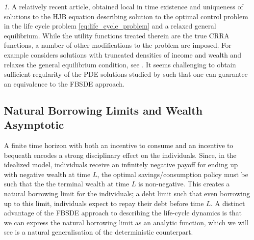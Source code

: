 \documentclass[11pt,oneside,english,reqno,dvipsnames,table]{amsart}
\numberwithin{equation}{section}
\theoremstyle{plain}
\theoremstyle{definition}
\theoremstyle{remark}
\newtheorem{rem}[thm]{\protect\remarkname}
\theoremstyle{plain}
\theoremstyle{plain}
\theoremstyle{plain}
\theoremstyle{plain}
\theoremstyle{plain}
\theoremstyle{plain}
\theoremstyle{plain}
\providecommand{\remarkname}{Remark}
\providecommand{\remarkname}{Remark}
\numberwithin{thm}{section}
\begin{document}
\begin{rem}
 A relatively recent article, \cite{ambrose_21_existence} obtained local in time existence and uniqueness of solutions to the HJB equation describing solution to the optimal control problem in the life cycle problem \eqref{eq:life_cycle_problem} and a relaxed general equilibrium. While the utility functions treated therein are the true CRRA functions, a number of other modifications to the problem are imposed. For example \cite{ambrose_21_existence} considers solutions with truncated densities of income and wealth and relaxes the general equilibrium condition, see \cite[Sec.~3]{ambrose_21_existence}. It seems challenging to obtain sufficient regularity of the PDE solutions studied by \cite{ambrose_21_existence} such that one can guarantee an equivalence to the FBSDE approach.
    

%    
\end{rem}


\subsection{Natural Borrowing Limits and Wealth Asymptotic}
%
A finite time horizon with both an incentive to consume and an incentive to bequeath encodes a strong disciplinary effect on the individuals. Since, in the idealized model, individuals receive an infinitely negative payoff for ending up with negative wealth at time $L$, the optimal savings/consumption policy must be such that the the terminal wealth at time $L$ is non-negative. 
This creates a natural borrowing limit for the individuals; a debt limit such that even borrowing up to this limit, individuals expect to  repay their debt before time $L$. A distinct advantage of the FBSDE approach to describing the life-cycle dynamics is that we can express the natural borrowing limit as an analytic function, which we will see is a natural generalisation of the deterministic counterpart.  
\end{document}
